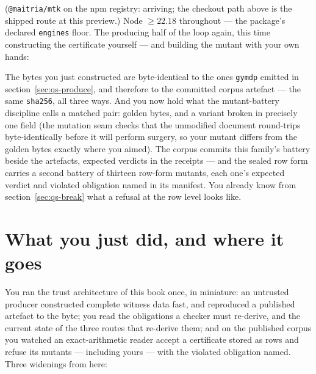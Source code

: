 \noindent (\texttt{@maitria/mtk} on the npm registry: arriving; the
checkout path above is the shipped route at this preview.) Node
$\ge 22.18$ throughout --- the package's declared \texttt{engines}
floor. The producing half of the loop again, this time
constructing the certificate yourself --- and building the mutant
with your own hands:





The bytes you just constructed are byte-identical to the ones
\texttt{gymdp} emitted in section~\ref{sec:qs-produce}, and therefore
to the committed corpus artefact --- the same \texttt{sha256}, all
three ways. And you now hold what the mutant-battery discipline calls
a matched pair: golden bytes, and a variant broken in precisely one
field (the mutation seam checks that the unmodified document
round-trips byte-identically before it will perform surgery, so your
mutant differs from the golden bytes exactly where you aimed). The
corpus commits this family's battery beside the artefacts, expected
verdicts in the receipts --- and the sealed row form carries a second
battery of thirteen row-form mutants, each one's expected verdict and
violated obligation named in its manifest. You already know from
section~\ref{sec:qs-break} what a refusal at the row level looks
like.

\section{What you just did, and where it goes}
\label{sec:qs-next}

You ran the trust architecture of this book once, in miniature: an
untrusted producer constructed complete witness data fast, and
reproduced a published artefact to the byte; you read the obligations
a checker must re-derive, and the current state of the three routes
that re-derive them; and on the published corpus you watched an
exact-arithmetic reader accept a certificate stored as rows and
refuse its mutants --- including yours --- with the violated
obligation named. Three widenings from here:

